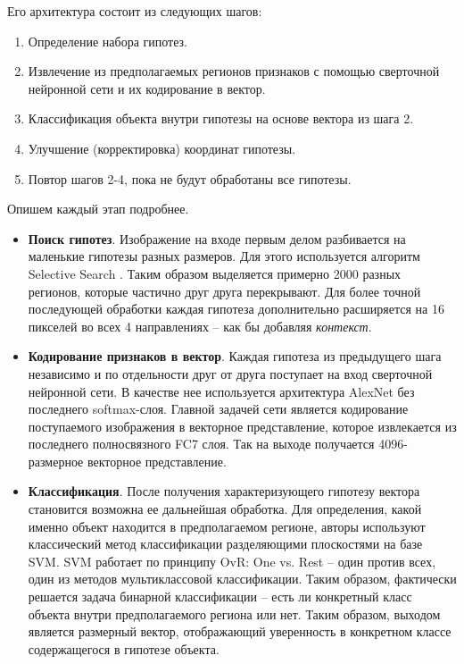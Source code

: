 Его архитектура состоит из следующих шагов:

\begin{enumerate}[1.]
	\item Определение набора гипотез.
	\item Извлечение из предполагаемых регионов признаков с помощью сверточной нейронной сети и их кодирование в вектор.
	\item Классификация объекта внутри гипотезы на основе вектора из шага 2.
	\item Улучшение (корректировка) координат гипотезы.
	\item Повтор шагов 2-4, пока не будут обработаны все гипотезы.
\end{enumerate}

Опишем каждый этап подробнее.

\begin{itemize}
	\item \textbf{Поиск гипотез}. Изображение на входе первым делом разбивается на маленькие гипотезы разных размеров. Для этого используется алгоритм Selective Search \cite{ssearch}. Таким образом выделяется примерно 2000 разных регионов, которые частично друг друга перекрывают. Для более точной последующей обработки каждая гипотеза дополнительно расширяется на 16 пикселей во всех 4 направлениях -- как бы добавляя \textit{контекст}.
	
	\item \textbf{Кодирование признаков в вектор}. Каждая гипотеза из предыдущего шага независимо и по отдельности друг от друга поступает на вход сверточной нейронной сети. В качестве нее используется архитектура AlexNet без последнего softmax-слоя. Главной задачей сети является кодирование поступаемого изображения в векторное представление, которое извлекается из последнего полносвязного FC7 слоя. Так на выходе получается 4096-размерное векторное представление.
	
	\item \textbf{Классификация}. После получения характеризующего гипотезу вектора становится возможна ее дальнейшая обработка. Для определения, какой именно объект находится в предполагаемом регионе, авторы используют классический метод классификации разделяющими плоскостями на базе SVM. SVM работает по принципу OvR: One vs. Rest -- один против всех, один из методов мультиклассовой классификации. Таким образом, фактически решается задача бинарной классификации -- есть ли конкретный класс объекта внутри предполагаемого региона или нет. Таким образом, выходом является размерный вектор, отображающий уверенность в конкретном классе содержащегося в гипотезе объекта.
	

\end{itemize}
